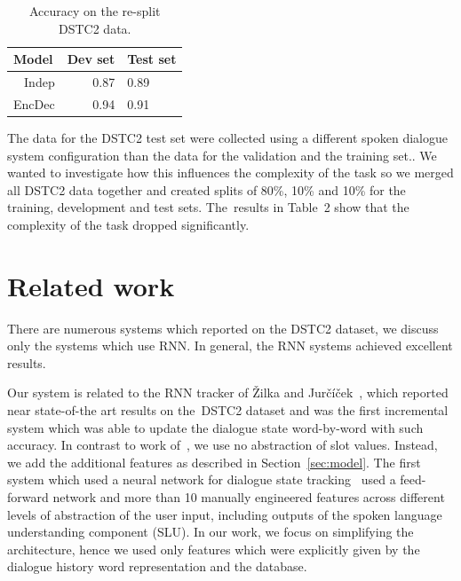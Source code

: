 \documentclass{itatnew}
\begin{document}
\begin{table}
\vspace{-0.80em}
\begin{center}
\begin{tabular}{r@{\quad}rll}
\hline
\multicolumn{1}{l}{\rule{0pt}{12pt}
                   Model}&\multicolumn{1}{l}{Dev set}&\multicolumn{2}{l}{Test set}\\[2pt]
\hline\rule{0pt}{12pt}
Indep  &   0.87 & 0.89 \\
EncDec &   0.94 & 0.91 \\
\hline
\end{tabular}
\caption{Accuracy on the re-split DSTC2 data.}
\vspace{-2em}
\end{center}
\label{tabsplit}
\end{table}

The data for the DSTC2 test set were collected using a different spoken dialogue system configuration than the data for the validation and the training set.\cite{henderson2014second}.
We wanted to investigate how this influences the complexity of the task so we merged all DSTC2 data together and created splits of 80\%, 10\% and 10\% for the training, development and test sets.
The~results in Table~2 show that the complexity of the task dropped significantly.


\section{Related work}\label{sec:related}
There are numerous systems which reported on the DSTC2 dataset, we discuss only the systems which use RNN.
In general, the RNN systems achieved excellent results.

Our system is related to the RNN tracker of Žilka and Jurčíček~\cite{zilka2015incremental},
which reported near state-of-the art results on the~DSTC2 dataset and was the first incremental system which was able to update the dialogue state word-by-word with such accuracy.
In contrast to work of~\cite{zilka2015incremental}, we use no abstraction of slot values. 
Instead, we add the additional features as described in Section~\ref{sec:model}.
The first system which used a neural network for dialogue state tracking~\cite{henderson2013deep} used a feed-forward network and more than 10 manually engineered features across different levels of abstraction of the user input, including outputs of the spoken language understanding component (SLU).
In our work, we focus on simplifying the architecture, hence we used only features which were explicitly given by the dialogue history word representation and the database.
\end{document}
